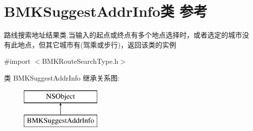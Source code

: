 \hypertarget{interface_b_m_k_suggest_addr_info}{}\section{B\+M\+K\+Suggest\+Addr\+Info类 参考}
\label{interface_b_m_k_suggest_addr_info}


路线搜索地址结果类.\+当输入的起点或终点有多个地点选择时，或者选定的城市没有此地点，但其它城市有(驾乘或步行)，返回该类的实例  




{\ttfamily \#import $<$B\+M\+K\+Route\+Search\+Type.\+h$>$}

类 B\+M\+K\+Suggest\+Addr\+Info 继承关系图\+:\begin{figure}[H]
\begin{center}
\leavevmode
\includegraphics[height=2.000000cm]{interface_b_m_k_suggest_addr_info}
\end{center}
\end{figure}
